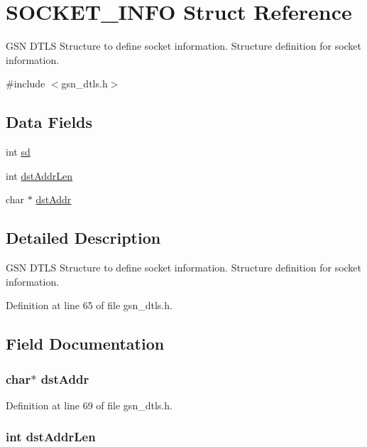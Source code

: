 \hypertarget{a00460}{
\section{SOCKET\_\-INFO Struct Reference}
\label{a00460}
}


GSN DTLS Structure to define socket information. Structure definition for socket information.  




{\ttfamily \#include $<$gsn\_\-dtls.h$>$}

\subsection*{Data Fields}
\begin{DoxyCompactItemize}
\item 
int \hyperlink{a00460_a06b0afe769d54ae94259d8532bc878b0}{sd}
\item 
int \hyperlink{a00460_a7bfa6c2032163f3e4177cee8a9c43400}{dstAddrLen}
\item 
char $\ast$ \hyperlink{a00460_a6a688c409c2233207acdc0da498900ac}{dstAddr}
\end{DoxyCompactItemize}


\subsection{Detailed Description}
GSN DTLS Structure to define socket information. Structure definition for socket information. 

Definition at line 65 of file gsn\_\-dtls.h.



\subsection{Field Documentation}
\hypertarget{a00460_a6a688c409c2233207acdc0da498900ac}{
\subsubsection[{dstAddr}]{\setlength{\rightskip}{0pt plus 5cm}char$\ast$ {\bf dstAddr}}}
\label{a00460_a6a688c409c2233207acdc0da498900ac}


Definition at line 69 of file gsn\_\-dtls.h.

\hypertarget{a00460_a7bfa6c2032163f3e4177cee8a9c43400}{
\subsubsection[{dstAddrLen}]{\setlength{\rightskip}{0pt plus 5cm}int {\bf dstAddrLen}}}
\label{a00460_a7bfa6c2032163f3e4177cee8a9c43400}


